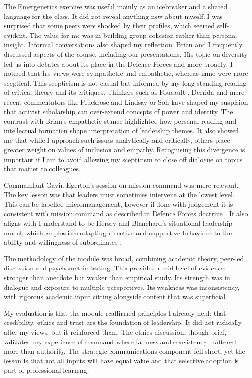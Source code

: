 The Emergenetics exercise was useful mainly as an icebreaker and a shared language for the class. It did not reveal anything new about myself. I was surprised that some peers were shocked by their profiles, which seemed self-evident. The value for me was in building group cohesion rather than personal insight. Informal conversations also shaped my reflection. Brian and I frequently discussed aspects of the course, including our presentations. His topic on diversity led us into debates about its place in the Defence Forces and more broadly. I noticed that his views were sympathetic and empathetic, whereas mine were more sceptical. This scepticism is not casual but informed by my long-standing reading of critical theory and its critiques. Thinkers such as Foucault \parencite{FOUCAULT_1977}, Derrida \parencite{DERRIDA_1978} and more recent commentators like Pluckrose and Lindsay \parencite{PLUCKROSE_2020} or Soh \parencite{SOH_2021} have shaped my suspicion that activist scholarship can over-extend concepts of power and identity. The contrast with Brian’s empathetic stance highlighted how personal reading and intellectual formation shape interpretation of leadership themes. It also showed me that while I approach such issues analytically and critically, others place greater weight on values of inclusion and empathy. Recognising this divergence is important if I am to avoid allowing my scepticism to close off dialogue on topics that matter to colleagues.


Commandant Gavin Egerton’s session on mission command was more relevant. The key lesson was that leaders must sometimes intervene at the lowest level. This can be labelled micromanagement, however if done with judgement it is consistent with mission command as described in Defence Forces doctrine \parencite{DF_LDR_2023}. It also aligns with I understand to be Hersey and Blanchard’s situational leadership model, which emphasises adapting directive and supportive behaviour to the ability and willingness of subordinates \parencite{HERSEY_1969}.  

The methodology of the module was broad, combining academic theory, peer-led discussion and psychometric testing. This provides a mid-level of evidence: stronger than anecdote but weaker than empirical study. Its strength was in dialogue and exposure to multiple perspectives. Its weakness was inconsistency, with rigorous academic input sitting alongside content that was superficial.  

My evaluation is that the module reaffirmed principles I already held: that credibility, ethics and trust are the foundation of leadership. It did not radically alter my views, but it reinforced them. The ethics discussion, though brief, validated my experience of command where fairness and consistency mattered more than authority. The strategic communications component fell short, yet the lesson is that not all inputs will have equal value and that selective adoption is part of professional learning.  

